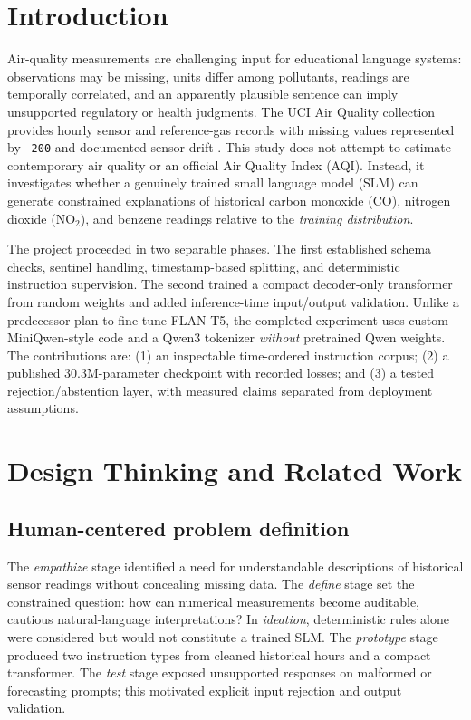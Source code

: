\documentclass[conference,a4paper,10pt]{IEEEtran}
\begin{document}
\section{Introduction}
Air-quality measurements are challenging input for educational language systems: observations may be missing, units differ among pollutants, readings are temporally correlated, and an apparently plausible sentence can imply unsupported regulatory or health judgments. The UCI Air Quality collection provides hourly sensor and reference-gas records with missing values represented by \texttt{-200} and documented sensor drift \cite{uci,devito}. This study does not attempt to estimate contemporary air quality or an official Air Quality Index (AQI). Instead, it investigates whether a genuinely trained small language model (SLM) can generate constrained explanations of historical carbon monoxide (CO), nitrogen dioxide (NO$_2$), and benzene readings relative to the \emph{training distribution}.

The project proceeded in two separable phases. The first established schema checks, sentinel handling, timestamp-based splitting, and deterministic instruction supervision. The second trained a compact decoder-only transformer from random weights and added inference-time input/output validation. Unlike a predecessor plan to fine-tune FLAN-T5, the completed experiment uses custom MiniQwen-style code and a Qwen3 tokenizer \emph{without} pretrained Qwen weights. The contributions are: (1) an inspectable time-ordered instruction corpus; (2) a published 30.3M-parameter checkpoint with recorded losses; and (3) a tested rejection/abstention layer, with measured claims separated from deployment assumptions.

\section{Design Thinking and Related Work}
\subsection{Human-centered problem definition}
The \emph{empathize} stage identified a need for understandable descriptions of historical sensor readings without concealing missing data. The \emph{define} stage set the constrained question: how can numerical measurements become auditable, cautious natural-language interpretations? In \emph{ideation}, deterministic rules alone were considered but would not constitute a trained SLM. The \emph{prototype} stage produced two instruction types from cleaned historical hours and a compact transformer. The \emph{test} stage exposed unsupported responses on malformed or forecasting prompts; this motivated explicit input rejection and output validation.
\end{document}
